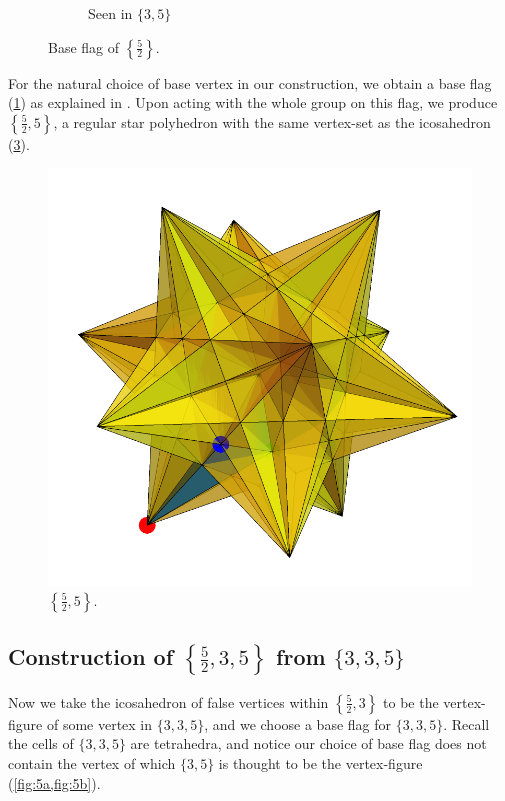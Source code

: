 \documentclass{article}
\theoremstyle{definition}
\begin{document}
\begin{figure}[H]
\begin{center}
\begin{subfigure}{0.4\linewidth}
				\caption{Seen in $\{3,5\}$}\label{fig:3b}
			\end{subfigure}
		\end{center}
		\caption{Base flag of $\left\{\frac{5}{2}\right\}$.}\label{fig:3}
	\end{figure}
	
	For the natural choice of base vertex in our construction, we obtain a base flag (\cref{fig:3b}) as explained in . Upon acting with the whole group on this flag, we produce $\left\{\frac{5}{2},5\right\}$, a regular star polyhedron with the same vertex-set as the icosahedron (\cref{fig:4}).
	
	\begin{figure}[H]
		\centering
		\includegraphics[width=.5\linewidth]{fig4}
		\caption{$\left\{\frac{5}{2},5\right\}$.}\label{fig:4}
	\end{figure}
	
	
	\subsection{Construction of $\left\{\frac{5}{2},3,5\right\}$ from $\{3,3,5\}$}
	
	Now we take the icosahedron of false vertices within $\left\{\frac{5}{2},3\right\}$ to be the vertex-figure of some vertex in $\{3,3,5\}$, and we choose a base flag for $\{3,3,5\}$. Recall the cells of $\{3,3,5\}$ are tetrahedra, and notice our choice of base flag does not contain the vertex of which $\{3,5\}$ is thought to be the vertex-figure (\cref{fig:5a,fig:5b}).
\end{document}
